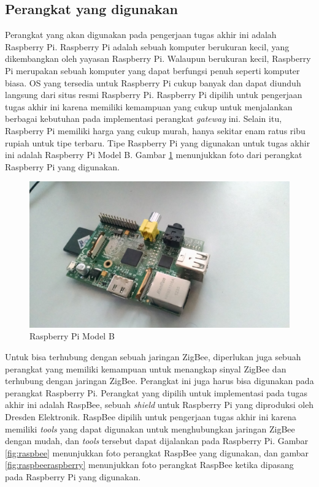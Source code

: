 \subsection{Perangkat yang digunakan}
Perangkat yang akan digunakan pada pengerjaan tugas akhir ini adalah Raspberry Pi. Raspberry Pi adalah sebuah komputer berukuran kecil, yang dikembangkan oleh yayasan Raspberry Pi. Walaupun berukuran kecil, Raspberry Pi merupakan sebuah komputer yang dapat berfungsi penuh seperti komputer biasa. OS yang tersedia untuk Raspberry Pi cukup banyak dan dapat diunduh langsung dari situs resmi Raspberry Pi. Raspberry Pi dipilih untuk pengerjaan tugas akhir ini karena memiliki kemampuan yang cukup untuk menjalankan berbagai kebutuhan pada implementasi perangkat \textit{gateway} ini. Selain itu, Raspberry Pi memiliki harga yang cukup murah, hanya sekitar enam ratus ribu rupiah untuk tipe terbaru. Tipe Raspberry Pi yang digunakan untuk tugas akhir ini adalah Raspberry Pi Model B. Gambar \ref{fig:raspberry} menunjukkan foto dari perangkat Raspberry Pi yang digunakan.

\begin{figure}
	\centering
	\includegraphics[width=.9\textwidth]{pics/raspberry.jpg}
	\caption{Raspberry Pi Model B}
	\label{fig:raspberry}
\end{figure}

Untuk bisa terhubung dengan sebuah jaringan ZigBee, diperlukan juga sebuah perangkat yang memiliki kemampuan untuk menangkap sinyal ZigBee dan terhubung dengan jaringan ZigBee. Perangkat ini juga harus bisa digunakan pada perangkat Raspberry Pi. Perangkat yang dipilih untuk implementasi pada tugas akhir ini adalah RaspBee, sebuah \textit{shield} untuk Raspberry Pi yang diproduksi oleh Dresden Elektronik. RaspBee dipilih untuk pengerjaan tugas akhir ini karena memiliki \textit{tools} yang dapat digunakan untuk menghubungkan jaringan ZigBee dengan mudah, dan \textit{tools} tersebut dapat dijalankan pada Raspberry Pi. Gambar \ref{fig:raspbee} menunjukkan foto perangkat RaspBee yang digunakan, dan gambar \ref{fig:raspbeeraspberry} menunjukkan foto perangkat RaspBee ketika dipasang pada Raspberry Pi yang digunakan.

